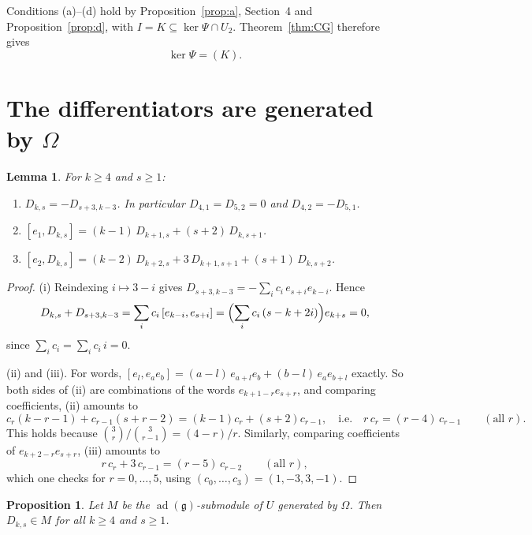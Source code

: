 \documentclass[11pt]{amsart}
\newtheorem{proposition}[theorem]{Proposition}
\newtheorem{lemma}[theorem]{Lemma}
\theoremstyle{definition}
\theoremstyle{remark}
\newcommand{\g}{\mathfrak{g}}
\newcommand{\U}{U}
\newcommand{\ad}{\operatorname{ad}}
\begin{document}
Conditions (a)--(d) hold by Proposition~\ref{prop:a}, Section~4 and Proposition~\ref{prop:d}, with $I=K\subseteq\ker\Psi\cap\U_2$. Theorem~\ref{thm:CG} therefore gives
\begin{equation}\label{eq:quadgen}
\ker\Psi=(K).
\end{equation}

\section{The differentiators are generated by \texorpdfstring{$\Omega$}{Omega}}

\begin{lemma}\label{lem:brackets}
For $k\ge4$ and $s\ge1$:
\begin{enumerate}[label=\textup{(\roman*)}]
\item $D_{k,s}=-D_{s+3,k-3}$. In particular $D_{4,1}=D_{5,2}=0$ and $D_{4,2}=-D_{5,1}$.
\item $[e_1,D_{k,s}]=(k-1)\,D_{k+1,s}+(s+2)\,D_{k,s+1}$.
\item $[e_2,D_{k,s}]=(k-2)\,D_{k+2,s}+3\,D_{k+1,s+1}+(s+1)\,D_{k,s+2}$.
\end{enumerate}
\end{lemma}

\begin{proof}
(i) Reindexing $i\mapsto3-i$ gives $D_{s+3,k-3}=-\sum_ic_i\,e_{s+i}e_{k-i}$. Hence
\[
D_{k,s}+D_{s+3,k-3}=\sum_ic_i\,[e_{k-i},e_{s+i}]=\Bigl(\sum_ic_i\,(s-k+2i)\Bigr)e_{k+s}=0,
\]
since $\sum_ic_i=\sum_ic_i\,i=0$.

(ii) and (iii). For words, $[e_l,e_ae_b]=(a-l)\,e_{a+l}e_b+(b-l)\,e_ae_{b+l}$ exactly. So both sides of (ii) are combinations of the words $e_{k+1-r}e_{s+r}$, and comparing coefficients, (ii) amounts to
\[
c_r(k-r-1)+c_{r-1}(s+r-2)=(k-1)c_r+(s+2)c_{r-1},\quad\text{i.e.}\quad r\,c_r=(r-4)\,c_{r-1}\qquad(\text{all }r).
\]
This holds because $\binom3r/\binom3{r-1}=(4-r)/r$. Similarly, comparing coefficients of $e_{k+2-r}e_{s+r}$, (iii) amounts to
\[
r\,c_r+3\,c_{r-1}=(r-5)\,c_{r-2}\qquad(\text{all }r),
\]
which one checks for $r=0,\dots,5$, using $(c_0,\dots,c_3)=(1,-3,3,-1)$.
\end{proof}

\begin{proposition}\label{prop:gen}
Let $M$ be the $\ad(\g)$-submodule of $\U$ generated by $\Omega$. Then $D_{k,s}\in M$ for all $k\ge4$ and $s\ge1$.
\end{proposition}
\end{document}
